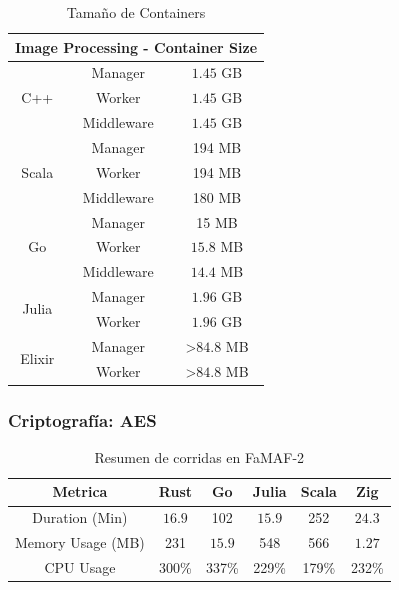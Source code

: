 \documentclass[11pt]{article}
\let\Oldsubsubsection\subsubsection
\renewcommand{\subsubsection}{\FloatBarrier\Oldsubsubsection}
\begin{document}
\begin{table}[H]
\centering
\begin{tabular}{|ccc|}
\hline
\multicolumn{3}{|c|}{Image Processing - Container Size} \\ \hline
\multicolumn{1}{|c|}{\multirow{3}{*}{C++}} & \multicolumn{1}{c|}{Manager} & $1.45$ GB \\ \cline{2-3} 
\multicolumn{1}{|c|}{} & \multicolumn{1}{c|}{Worker} & $1.45$ GB \\ \cline{2-3} 
\multicolumn{1}{|c|}{} & \multicolumn{1}{c|}{Middleware} & $1.45$ GB \\ \hline
\multicolumn{1}{|c|}{\multirow{3}{*}{Scala}} & \multicolumn{1}{c|}{Manager} & 194 MB \\ \cline{2-3} 
\multicolumn{1}{|c|}{} & \multicolumn{1}{c|}{Worker} & 194 MB \\ \cline{2-3} 
\multicolumn{1}{|c|}{} & \multicolumn{1}{c|}{Middleware} & 180 MB \\ \hline
\multicolumn{1}{|c|}{\multirow{3}{*}{Go}} & \multicolumn{1}{c|}{Manager} & 15 MB \\ \cline{2-3} 
\multicolumn{1}{|c|}{} & \multicolumn{1}{c|}{Worker} & $15.8$ MB \\ \cline{2-3} 
\multicolumn{1}{|c|}{} & \multicolumn{1}{c|}{Middleware} & $14.4$ MB \\ \hline
\multicolumn{1}{|c|}{\multirow{2}{*}{Julia}} & \multicolumn{1}{c|}{Manager} & $1.96$ GB \\ \cline{2-3} 
\multicolumn{1}{|c|}{} & \multicolumn{1}{c|}{Worker} & $1.96$ GB \\ \hline
\multicolumn{1}{|c|}{\multirow{2}{*}{Elixir}} & \multicolumn{1}{c|}{Manager} & \textgreater{}$84.8$ MB \\ \cline{2-3} 
\multicolumn{1}{|c|}{} & \multicolumn{1}{c|}{Worker} & \textgreater{}$84.8$ MB \\ \hline
\end{tabular}
\caption{Tamaño de Containers}
\end{table}

\subsubsection{Criptografía: AES}

\begin{table}[H]
\centering
\begin{tabular}{|c|c|c|c|c|c|}
\hline
Metrica & Rust & Go & Julia & Scala & Zig \\ \hline
Duration (Min) & $16.9$ & 102 & $15.9$ & 252 & $24.3$ \\ \hline
Memory Usage (MB) & 231 & $15.9$ & 548 & 566 & $1.27$ \\ \hline
CPU Usage & 300\% & 337\% & 229\% & 179\% & 232\% \\ \hline
\end{tabular}
\caption{Resumen de corridas en FaMAF-2}
\end{table}
\end{document}
